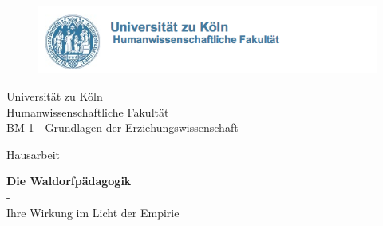 \begin{titlepage}



\begin{figure}[!ht]
	\centering
		\includegraphics[natwidth=920pt, natheight=95pt, width=1.0\textwidth]{Bilder/LogoUni.png}


\end{figure}

\begin{center}

\vspace{1cm}

\begin{large}
Universität zu Köln\\
Humanwissenschaftliche Fakultät\\
BM 1 - Grundlagen der Erziehungswissenschaft\\
\vspace{0.8cm}
\begin{scshape}
Hausarbeit\\ 
\end{scshape}
\end{large}


\vspace{1.7cm}

\begin{rmfamily}
\textbf{\huge Die Waldorfpädagogik}\\
\LARGE -\\
	Ihre Wirkung im Licht der Empirie\\
\normalsize
\end{rmfamily}

\vspace{1.7cm}
%


\end{center}
\end{titlepage}
